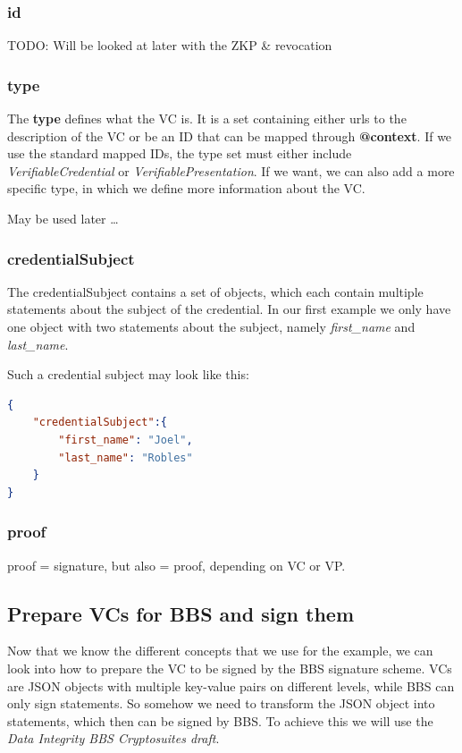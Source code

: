 \documentclass[
	a4paper               %
	,bibliography=totoc   %
	,listof=totoc         %
	,monolingual
	twoside=false,
]{bfhthesis}              %
\begin{document}
\subsubsection{id}

TODO: Will be looked at later with the ZKP \& revocation

\subsubsection{type}

The \textbf{type} defines what the VC is. 
It is a set containing either urls to the description of the VC or be an ID that can be mapped through \textbf{@context}.
If we use the standard mapped IDs, the type set must either include \textit{VerifiableCredential} or \textit{VerifiablePresentation}.
If we want, we can also add a more specific type, in which we define more information about the VC.

May be used later \dots

\subsubsection{credentialSubject}
The credentialSubject contains a set of objects, which each contain multiple statements about the subject of the credential.
In our first example we only have one object with two statements about the subject, namely \textit{first\_name} and \textit{last\_name}.

Such a credential subject may look like this:
\begin{lstlisting}[language=json,firstnumber=1,caption={Example credentialSubject},captionpos=b]
{
	"credentialSubject":{
		"first_name": "Joel",
		"last_name": "Robles"
	}
}
\end{lstlisting}

\subsubsection{proof}

proof = signature, but also = proof, depending on VC or VP.

\subsection{Prepare VCs for BBS and sign them}
\label{sub:preparevc}
Now that we know the different concepts that we use for the example, we can look into how to prepare the VC to be signed by the BBS signature scheme.
VCs are JSON objects with multiple key-value pairs on different levels, while BBS can only sign statements.
So somehow we need to transform the JSON object into statements, which then can be signed by BBS.
To achieve this we will use the \textit{Data Integrity BBS Cryptosuites draft}\cite{bbsvc}.
\end{document}
